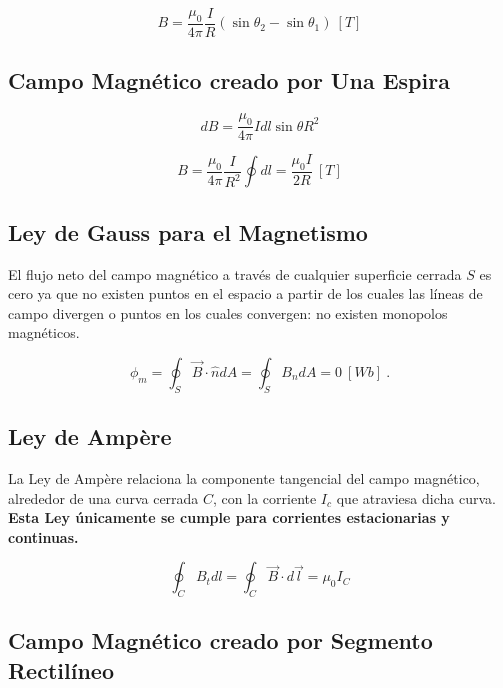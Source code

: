 \documentclass{tufte-handout}
\begin{document}
\begin{equation}
B = \frac{\mu_0}{4\pi}\frac{I}{R}(\sin{\theta_2}-\sin{\theta_1})~[T]
\end{equation}

\subsection{Campo Magnético creado por Una Espira}

\begin{equation}
dB = \frac{\mu_0}{4\pi}{Idl\sin{\theta}}{R^2}
\end{equation}

\begin{equation}
B = \frac{\mu_0}{4\pi}\frac{I}{R^2}\oint dl = \frac{\mu_0 I}{2R}~[T]
\end{equation}

\subsection{Ley de Gauss para el Magnetismo}

El flujo neto del campo magnético a través de cualquier superficie cerrada $S$ es cero ya que no existen puntos en el espacio a partir de los cuales las líneas de campo divergen o puntos en los cuales convergen: no existen monopolos magnéticos.

\begin{equation}
\phi_m = \oint_S \vec{B}\cdot\hat{n}dA = \oint_S B_ndA = 0~[Wb]~.
\end{equation}

\subsection{Ley de Ampère}

La Ley de Ampère relaciona la componente tangencial del campo magnético, alrededor de una curva cerrada $C$, con la corriente $I_c$ que atraviesa dicha curva. \textbf{Esta Ley únicamente se cumple para corrientes estacionarias y continuas.}

\begin{equation}
\oint_C B_t dl = \oint_C \vec{B}\cdot d\vec{l} = \mu_0 I_C
\end{equation}

\subsection{Campo Magnético creado por Segmento Rectilíneo}
\end{document}
